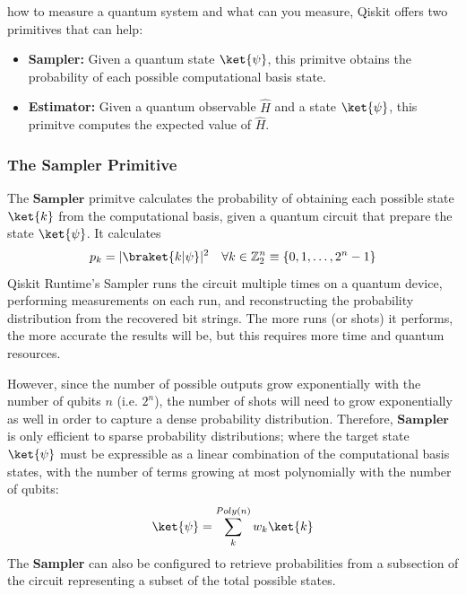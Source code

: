 \documentclass[12pt, oneside]{book}
\theoremstyle{definition}
\theoremstyle{definition}
\theoremstyle{remark}
\begin{document}
how to measure a quantum system and what can you measure, Qiskit offers two primitives that can help:
\begin{itemize}
    \item \textbf{Sampler: }Given a quantum state $\ket{\psi}$, this primitve obtains the probability of each possible computational basis state.
    \item \textbf{Estimator: } Given a quantum observable $\hat{H}$ and a state $\ket{\psi}$, this primitve computes the expected value of $\hat{H}$.
\end{itemize}

\subsubsection{The Sampler Primitive}
The $\textbf{Sampler}$ primitve calculates the probability of obtaining each possible state $\ket{k}$ from the computational basis, given a quantum circuit that prepare the state $\ket{\psi}$. It calculates
\[
    p_k=|\braket{k|\psi}|^2 \quad \forall k\in\mathbb{Z}_2^n \equiv \{0,1,\ldots, 2^n-1\}
\]
Qiskit Runtime's Sampler runs the circuit multiple times on a quantum device, performing measurements on each run, and reconstructing the probability distribution from the recovered bit strings. The more runs (or shots) it performs, the more accurate the results will be, but this requires more time and quantum resources.

However, since the number of possible outputs grow exponentially with the number of qubits $n$ (i.e. $2^n$), the number of shots will need to grow exponentially as well in order to capture a dense probability distribution. Therefore, $\textbf{Sampler}$ is only efficient to sparse probability distributions; where the target state $\ket{\psi}$ must be expressible as a linear combination of the computational basis states, with the number of terms growing at most polynomially with the number of qubits:
\[
\ket{\psi} = \sum_k^{Poly(n)} w_k\ket{k}
\]
The \textbf{Sampler} can also be configured to retrieve probabilities from a subsection of the circuit representing a subset of the total possible states.
\end{document}
